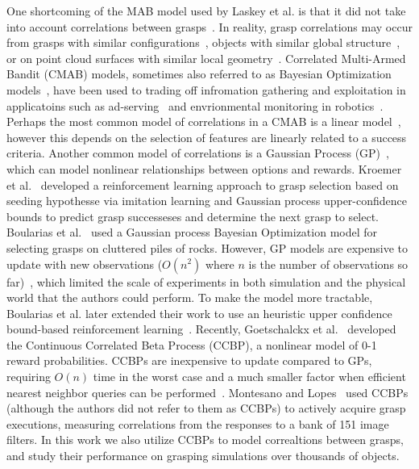 One shortcoming of the MAB model used by Laskey et al. is that it did not take into account correlations between grasps~\cite{laskey2015bandits}.
In reality, grasp correlations may occur from grasps with similar configurations~\cite{ciocarlie2009, detry2011learning}, objects with similar global structure~\cite{pokorny2013grasp}, or on point cloud surfaces with similar local geometry~\cite{boularias2011learning, herzog2012template, kroemer2010combining, saxena2008robotic}.
Correlated Multi-Armed Bandit (CMAB) models, sometimes also referred to as Bayesian Optimization models~\cite{brochu2010tutorial}, have been used to trading off infromation gathering and exploitation in applicatoins such as ad-serving~\cite{chu2011contextual} and envrionmental monitoring in robotics~\cite{hitz2014fully, marchant2012bayesian}.
Perhaps the most common model of correlations in a CMAB is a linear model~\cite{chu2011contextual}, however this depends on the selection of features are linearly related to a success criteria.
Another common model of correlations is a Gaussian Process (GP)~\cite{rasmussen2006}, which can model nonlinear relationships between options and rewards.
Kroemer et al.~\cite{kroemer2010combining} developed a reinforcement learning approach to grasp selection based on seeding hypothesse via imitation learning and Gaussian process upper-confidence bounds to predict grasp successeses and determine the next grasp to select.
Boularias et al.~\cite{boularias2014efficient} used a Gaussian process Bayesian Optimization model for selecting grasps on cluttered piles of rocks. 
However, GP models are expensive to update with new observations ($O(n^2)$ where $n$ is the number of observations so far)~\cite{rasmussen2006}, which limited the scale of experiments in both simulation and the physical world that the authors could perform.
To make the model more tractable, Boularias et al. later extended their work to use an heuristic upper confidence bound-based reinforcement learning~\cite{boularias2015learning}.
Recently, Goetschalckx et al.~\cite{goetschalckx2011continuous} developed the Continuous Correlated Beta Process (CCBP), a nonlinear model of 0-1 reward probabilities.
CCBPs are inexpensive to update compared to GPs, requiring $O(n)$ time in the worst case and a much smaller factor when efficient nearest neighbor queries can be performed~\cite{goetschalckx2011continuous}.
Montesano and Lopes~\cite{montesano2012active} used CCBPs (although the authors did not refer to them as CCBPs) to actively acquire grasp executions, measuring correlations from the responses to a bank of 151 image filters.
In this work we also utilize CCBPs to model correaltions between grasps, and study their performance on grasping simulations over thousands of objects.









